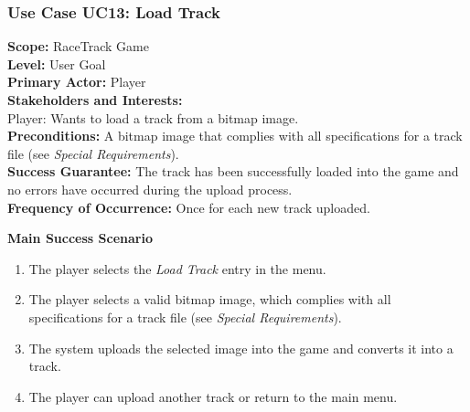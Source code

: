 		\subsubsection{Use Case UC13: Load Track}
			\textbf{Scope:} RaceTrack Game \\
			\textbf{Level:} User Goal \\
			\textbf{Primary Actor:} Player \\
			\textbf{Stakeholders and Interests:} \\
			Player: Wants to load a track from a bitmap image. \\
			\textbf{Preconditions:} A bitmap image that complies with all specifications for a track file (see \textit{Special Requirements}). \\
			\textbf{Success Guarantee:} The track has been successfully loaded into the game and no errors have occurred during the upload process. \\
			\textbf{Frequency of Occurrence:} Once for each new track uploaded.
			\newline

			\textbf{Main Success Scenario}
				\begin{enumerate}
					\item The player selects the \textit{Load Track} entry in the menu.
					\item The player selects a valid bitmap image, which complies with all specifications for a track file (see \textit{Special Requirements}).
					\item The system uploads the selected image into the game and converts it into a track.
					\item The player can upload another track or return to the main menu.
				\end{enumerate}

